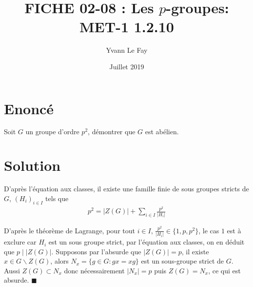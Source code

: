 \documentclass{article}
\newcommand*{\QED}{\hfill\ensuremath{\blacksquare}}%
\begin{document}
\title{FICHE 02-08 : Les $p$-groupes: MET-1 1.2.10}
\author{Yvann Le Fay}
\date{Juillet 2019}
\maketitle
\section*{Enoncé}
Soit $G$ un groupe d'ordre $p^2$, démontrer que $G$ est abélien.
\section*{Solution}
D'après l'équation aux classes, il existe une famille finie de sous groupes stricts de $G$, $(H_i)_{i\in I}$ tels que
\begin{align*}
p^2 = |Z(G)| + \sum_{i\in I}\frac{p^2}{|H_i|}
\end{align*}

D'après le théorème de Lagrange, pour tout $i\in I$, $\frac{p^2}{|H_i|}\in\{1,p,p^2\}$, le cas $1$ est à exclure car $H_i$ est un sous groupe strict, par l'équation aux classes, on en déduit que $p\mid |Z(G)|$. Supposons par l'absurde que $|Z(G)| = p$, il existe $x\in G\backslash Z(G)$, alors $N_x = \{g\in G : gx=xg\}$ est un sous-groupe strict de $G$. Aussi $Z(G)\subset N_x$ donc nécessairement $|N_x|=p$ puis $Z(G)=N_x$, ce qui est absurde.
\QED
\end{document}
